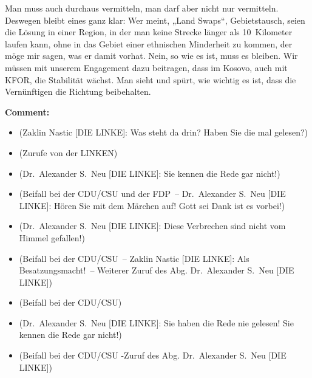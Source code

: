 \documentclass{article}
\begin{document}
Man muss auch durchaus vermitteln, man darf aber nicht nur vermitteln. Deswegen bleibt eines ganz klar: Wer meint, „Land Swaps“, Gebietstausch, seien die Lösung in einer Region, in der man keine Strecke länger als 10 Kilometer laufen kann, ohne in das Gebiet einer ethnischen Minderheit zu kommen, der möge mir sagen, was er damit vorhat. Nein, so wie es ist, muss es bleiben. Wir müssen mit unserem Engagement dazu beitragen,  dass im Kosovo, auch mit KFOR, die Stabilität wächst. Man sieht und spürt, wie wichtig es ist, dass die Vernünftigen die Richtung beibehalten.  

\noindent\textbf{Comment:}
\begin{itemize}
    \setlength\itemsep{-3pt}
    \item (Zaklin Nastic [DIE LINKE]: Was steht da drin? Haben Sie die mal gelesen?)
    \setlength\itemsep{-3pt}
    \item (Zurufe von der LINKEN)
    \setlength\itemsep{-3pt}
    \item (Dr. Alexander S. Neu [DIE LINKE]: Sie kennen die Rede gar nicht!)
    \setlength\itemsep{-3pt}
    \item (Beifall bei der CDU/CSU und der FDP – Dr. Alexander S. Neu [DIE LINKE]: Hören Sie mit dem Märchen auf! Gott sei Dank ist es vorbei!)
    \setlength\itemsep{-3pt}
    \item (Dr. Alexander S. Neu [DIE LINKE]: Diese Verbrechen sind nicht vom Himmel gefallen!)
    \setlength\itemsep{-3pt}
    \item (Beifall bei der CDU/CSU – Zaklin Nastic [DIE LINKE]: Als Besatzungsmacht! – Weiterer Zuruf des Abg. Dr. Alexander S. Neu [DIE LINKE])
    \setlength\itemsep{-3pt}
    \item (Beifall bei der CDU/CSU)
    \setlength\itemsep{-3pt}
    \item (Dr. Alexander S. Neu [DIE LINKE]: Sie haben die Rede nie gelesen! Sie kennen die Rede gar nicht!)
    \setlength\itemsep{-3pt}
    \item (Beifall bei der CDU/CSU -Zuruf des Abg. Dr. Alexander S. Neu [DIE LINKE])
\end{itemize}
\end{document}
